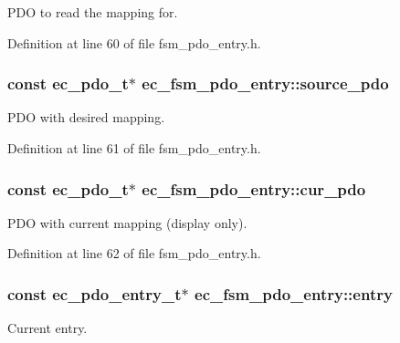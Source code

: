 \-P\-D\-O to read the mapping for. 



\-Definition at line 60 of file fsm\-\_\-pdo\-\_\-entry.\-h.

\subsubsection[{source\-\_\-pdo}]{\setlength{\rightskip}{0pt plus 5cm}const {\bf ec\-\_\-pdo\-\_\-t}$\ast$ {\bf ec\-\_\-fsm\-\_\-pdo\-\_\-entry\-::source\-\_\-pdo}}\label{structec__fsm__pdo__entry_a849f98cf92c6e7b30cfae04015f57ddf}


\-P\-D\-O with desired mapping. 



\-Definition at line 61 of file fsm\-\_\-pdo\-\_\-entry.\-h.

\subsubsection[{cur\-\_\-pdo}]{\setlength{\rightskip}{0pt plus 5cm}const {\bf ec\-\_\-pdo\-\_\-t}$\ast$ {\bf ec\-\_\-fsm\-\_\-pdo\-\_\-entry\-::cur\-\_\-pdo}}\label{structec__fsm__pdo__entry_ab0ff663f6628eb176343945947d5c7bc}


\-P\-D\-O with current mapping (display only). 



\-Definition at line 62 of file fsm\-\_\-pdo\-\_\-entry.\-h.

\subsubsection[{entry}]{\setlength{\rightskip}{0pt plus 5cm}const {\bf ec\-\_\-pdo\-\_\-entry\-\_\-t}$\ast$ {\bf ec\-\_\-fsm\-\_\-pdo\-\_\-entry\-::entry}}\label{structec__fsm__pdo__entry_a598d8f29602695173c6fe6f4e774cea8}


\-Current entry. 



